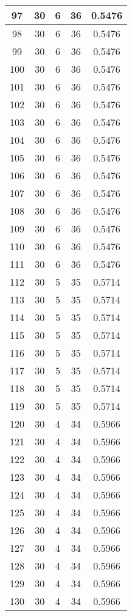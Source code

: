 \documentclass[letterpaper, 12pt]{article}
\begin{document}
\begin{longtable}{|c|c|c|c|c|}
\hline
97 & 30 & 6 & 36 & 0.5476 \\
\hline
98 & 30 & 6 & 36 & 0.5476 \\
\hline
99 & 30 & 6 & 36 & 0.5476 \\
\hline
100 & 30 & 6 & 36 & 0.5476 \\
\hline
101 & 30 & 6 & 36 & 0.5476 \\
\hline
102 & 30 & 6 & 36 & 0.5476 \\
\hline
103 & 30 & 6 & 36 & 0.5476 \\
\hline
104 & 30 & 6 & 36 & 0.5476 \\
\hline
105 & 30 & 6 & 36 & 0.5476 \\
\hline
106 & 30 & 6 & 36 & 0.5476 \\
\hline
107 & 30 & 6 & 36 & 0.5476 \\
\hline
108 & 30 & 6 & 36 & 0.5476 \\
\hline
109 & 30 & 6 & 36 & 0.5476 \\
\hline
110 & 30 & 6 & 36 & 0.5476 \\
\hline
111 & 30 & 6 & 36 & 0.5476 \\
\hline
112 & 30 & 5 & 35 & 0.5714 \\
\hline
113 & 30 & 5 & 35 & 0.5714 \\
\hline
114 & 30 & 5 & 35 & 0.5714 \\
\hline
115 & 30 & 5 & 35 & 0.5714 \\
\hline
116 & 30 & 5 & 35 & 0.5714 \\
\hline
117 & 30 & 5 & 35 & 0.5714 \\
\hline
118 & 30 & 5 & 35 & 0.5714 \\
\hline
119 & 30 & 5 & 35 & 0.5714 \\
\hline
120 & 30 & 4 & 34 & 0.5966 \\
\hline
121 & 30 & 4 & 34 & 0.5966 \\
\hline
122 & 30 & 4 & 34 & 0.5966 \\
\hline
123 & 30 & 4 & 34 & 0.5966 \\
\hline
124 & 30 & 4 & 34 & 0.5966 \\
\hline
125 & 30 & 4 & 34 & 0.5966 \\
\hline
126 & 30 & 4 & 34 & 0.5966 \\
\hline
127 & 30 & 4 & 34 & 0.5966 \\
\hline
128 & 30 & 4 & 34 & 0.5966 \\
\hline
129 & 30 & 4 & 34 & 0.5966 \\
\hline
130 & 30 & 4 & 34 & 0.5966 \\

\end{longtable}
\end{document}
